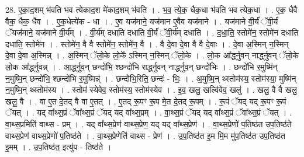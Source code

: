 \documentclass[17pt]{extarticle}
\begin{document}
28. ए॒का॒द॒शम् भ॑वति भव त्येकाद॒श मे॑काद॒शम् भ॑वति । . भ॒व॒ त्ये॒क॒ धैक॒धा भ॑वति भव त्येक॒धा । . ए॒क॒ धैवै वैक॒ धैक॒ धैव । . ए॒क॒धेत्ये॑क - धा । . ए॒व यज॑माने॒ यज॑मान ए॒वैव यज॑माने । . यज॑माने वी॒र्यं॑ ॅवी॒र्यं॑ ॅयज॑माने॒ यज॑माने वी॒र्य᳚म् । . वी॒र्य॑म् दधाति दधाति वी॒र्यं॑ ॅवी॒र्य॑म् दधाति । . द॒धा॒ति॒ स्तोमे॑न॒ स्तोमे॑न दधाति दधाति॒ स्तोमे॑न । . स्तोमे॑न॒ वै वै स्तोमे॑न॒ स्तोमे॑न॒ वै । . वै दे॒वा दे॒वा वै वै दे॒वाः । . दे॒वा अ॒स्मिन् न॒स्मिन् दे॒वा दे॒वा अ॒स्मिन्न् । . अ॒स्मिन् ॅलो॒के लो॒के᳚ ऽस्मिन् न॒स्मिन् ॅलो॒के । . लो॒क आ᳚र्द्ध्नुवन् नार्द्ध्नुवन् ॅलो॒के लो॒क आ᳚र्द्ध्नुवन्न् । . आ॒र्द्ध्नु॒व॒न् छन्दो॑भि॒ श्छन्दो॑भि रार्द्ध्नुवन् नार्द्ध्नुव॒न् छन्दो॑भिः । . छन्दो॑भि र॒मुष्मि॑न् न॒मुष्मि॒न् छन्दो॑भि॒ श्छन्दो॑भि र॒मुष्मिन्न्॑ । . छन्दो॑भि॒रिति॒ छन्दः॑ - भिः॒ । . अ॒मुष्मि॒न् थ्स्तोम॑स्य॒ स्तोम॑स्या॒ मुष्मि॑न् न॒मुष्मि॒न् थ्स्तोम॑स्य । . स्तोम॑ स्येवेव॒ स्तोम॑स्य॒ स्तोम॑स्येव । . इ॒व॒ खलु॒ खल्वि॑वेव॒ खलु॑ । . खलु॒ वै वै खलु॒ खलु॒ वै । . वा ए॒त दे॒तद् वै वा ए॒तत् । . ए॒तद् रू॒पꣳ रू॒प मे॒त दे॒तद् रू॒पम् । . रू॒पं ॅयद् यद् रू॒पꣳ रू॒पं ॅयत् । . यद् वा᳚थ्स॒प्रं ॅवा᳚थ्स॒प्रं ॅयद् यद् वा᳚थ्स॒प्रम् । . वा॒थ्स॒प्रं ॅयद् यद् वा᳚थ्स॒प्रं ॅवा᳚थ्स॒प्रं ॅयत् । . वा॒थ्स॒प्रमिति॑ वाथ्स - प्रम् । . यद् वा᳚थ्स॒प्रेण॑ वाथ्स॒प्रेण॒ यद् यद् वा᳚थ्स॒प्रेण॑ । . वा॒थ्स॒प्रेणो॑ प॒तिष्ठ॑त उप॒तिष्ठ॑ते वाथ्स॒प्रेण॑ वाथ्स॒प्रेणो॑ प॒तिष्ठ॑ते । . वा॒थ्स॒प्रेणेति॑ वाथ्स - प्रेण॑ । . उ॒प॒तिष्ठ॑त इ॒म मि॒म मु॑प॒तिष्ठ॑त उप॒तिष्ठ॑त इ॒मम् । . उ॒प॒तिष्ठ॑त॒ इत्यु॑प - तिष्ठ॑ते । \newline
\end{document}
